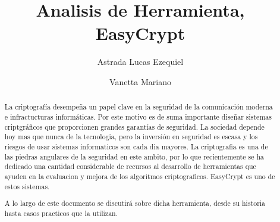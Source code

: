 \documentclass[runningheads,a4paper]{llncs}
\begin{document}
\mainmatter  %

\title{Analisis de Herramienta, EasyCrypt}


%
%
\author{Astrada Lucas Ezequiel
\and Vanetta Mariano}
%


%
%

\maketitle


\begin{abstract}
La criptografía desempeña un papel clave en la seguridad de la comunicación moderna e infractucturas informáticas.  Por este motivo es de suma importante diseñar sistemas criptgráficos que proporcionen grandes garantías de seguridad.
La sociedad depende hoy mas que nunca de la tecnologia, pero la inversión en seguridad es escasa y los riesgos de usar sistemas informaticos son cada dia mayores. La criptografia es una de las piedras angulares de la seguridad en este  ambito, por lo que recientemente se ha dedicado una cantidad considerable de recursos al desarrollo de herramientas que ayuden en la evaluacion y mejora de los algoritmos criptograficos. EasyCrypt es uno de estos sistemas. 

    A lo largo de este documento se discutirá sobre dicha herramienta, desde su historia hasta casos practicos que la utilizan.

\end{abstract}
\end{document}

